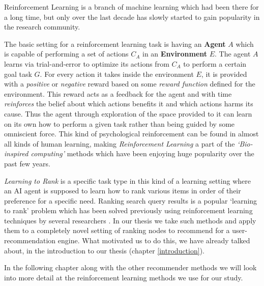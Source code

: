 Reinforcement Learning is a branch of machine learning which had been there for a long time, but only over the last decade has slowly started to gain popularity in the research community.

The basic setting for a reinforcement learning task is having an \textbf{Agent} $A$ which is capable of performing a set of actions $C_{A}$ in an \textbf{Environment} $E$. The agent $A$ learns via trial-and-error to optimize its actions from $C_{A}$ to perform a certain goal task $G$. For every action it takes inside the environment $E$, it is provided with a \textit{positive} or \textit{negative} reward based on some \textit{reward function} defined for the environment. This reward acts as a feedback for the agent and with time \textit{reinforces} the belief about which actions benefits it and which actions harms its cause. Thus the agent through exploration of the space provided to it can learn on its own how to perform a given task rather than being guided by some omniscient force. This kind of psychological reinforcement can be found in almost all kinds of human learning, making \textit{Reinforcement Learning} a part of the \textit{`Bio-inspired computing'} methods which have been enjoying huge popularity over the past few years.

\textit{Learning to Rank} is a specific task type in this kind of a learning setting where an AI agent is supposed to learn how to rank various items in order of their preference for a specific need. Ranking search query results is a popular `learning to rank' problem which has been solved previously using reinforcement learning techniques by several researchers \cite{radlinski2008learning,lattimore2018toprank}. In our thesis we take such methods and apply them to a completely novel setting of ranking nodes to recommend for a user-recommendation engine. What motivated us to do this, we have already talked about, in the introduction to our thesis (chapter \ref{introduction}). 

In the following chapter along with the other recommender methods we will look into more detail at the reinforcement learning methods we use for our study.